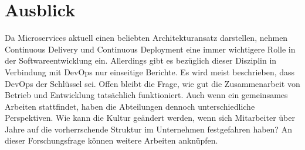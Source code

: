 \section{Ausblick}
Da Microservices aktuell einen beliebten Architekturansatz darstellen, nehmen Continuous Delivery und Continuous Deployment eine immer wichtigere Rolle in der Softwareentwicklung ein. Allerdings gibt es bezüglich dieser Disziplin in Verbindung mit DevOps nur einseitige Berichte. Es wird meist beschrieben, dass DevOps der Schlüssel sei. Offen bleibt die Frage, wie gut die Zusammenarbeit von Betrieb und Entwicklung tatsächlich funktioniert. Auch wenn ein gemeinsames Arbeiten stattfindet, haben die Abteilungen dennoch unterschiedliche Perspektiven. Wie kann die Kultur geändert werden, wenn sich Mitarbeiter über Jahre auf die vorherrschende Struktur im Unternehmen festgefahren haben? An dieser Forschungsfrage können weitere Arbeiten anknüpfen. 


\ifCLASSOPTIONcaptionsoff
  \newpage
\fi